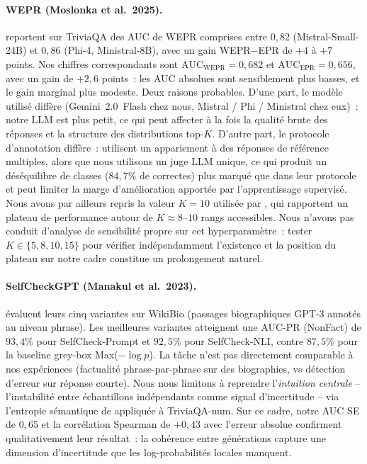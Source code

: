 \documentclass[12pt,a4paper]{article}
\begin{document}
\paragraph{WEPR (Moslonka et al.\ 2025).}
\citet{moslonka2026} reportent sur TriviaQA des AUC de WEPR comprises entre $0{,}82$ (Mistral-Small-24B) et $0{,}86$ (Phi-4, Ministral-8B), avec un gain WEPR$-$EPR de $+4$ à $+7$ points. Nos chiffres correspondants sont $\mathrm{AUC}_{\text{WEPR}} = 0{,}682$ et $\mathrm{AUC}_{\text{EPR}} = 0{,}656$, avec un gain de $+2{,}6$ points~: les AUC absolues sont sensiblement plus basses, et le gain marginal plus modeste. Deux raisons probables. D'une part, le modèle utilisé diffère (Gemini~2.0~Flash chez nous, Mistral / Phi / Ministral chez eux)~: notre LLM est plus petit, ce qui peut affecter à la fois la qualité brute des réponses et la structure des distributions top-$K$. D'autre part, le protocole d'annotation diffère~: \citet{moslonka2026} utilisent un appariement à des réponses de référence multiples, alors que nous utilisons un juge LLM unique, ce qui produit un déséquilibre de classes ($84{,}7\%$ de correctes) plus marqué que dans leur protocole et peut limiter la marge d'amélioration apportée par l'apprentissage supervisé. Nous avons par ailleurs repris la valeur $K=10$ utilisée par \citet{moslonka2026}, qui rapportent un plateau de performance autour de $K \approx 8$--$10$ rangs accessibles. Nous n'avons pas conduit d'analyse de sensibilité propre sur cet hyperparamètre~: tester $K \in \{5, 8, 10, 15\}$ pour vérifier indépendamment l'existence et la position du plateau sur notre cadre constitue un prolongement naturel.

\paragraph{SelfCheckGPT (Manakul et al.\ 2023).}
\citet{manakul2023selfcheckgpt} évaluent leurs cinq variantes sur WikiBio (passages biographiques GPT-3 annotés au niveau phrase). Les meilleures variantes atteignent une AUC-PR (NonFact) de $93{,}4\%$ pour SelfCheck-Prompt et $92{,}5\%$ pour SelfCheck-NLI, contre $87{,}5\%$ pour la baseline grey-box Max($-\log p$). La tâche n'est pas directement comparable à nos expériences (factualité phrase-par-phrase sur des biographies, vs détection d'erreur sur réponse courte). Nous nous limitons à reprendre l'\emph{intuition centrale} -- l'instabilité entre échantillons indépendants comme signal d'incertitude -- via l'entropie sémantique de \citet{kuhn2023semantic} appliquée à TriviaQA-num. Sur ce cadre, notre AUC SE de $0{,}65$ et la corrélation Spearman de $+0{,}43$ avec l'erreur absolue confirment qualitativement leur résultat~: la cohérence entre générations capture une dimension d'incertitude que les log-probabilités locales manquent.
\end{document}
